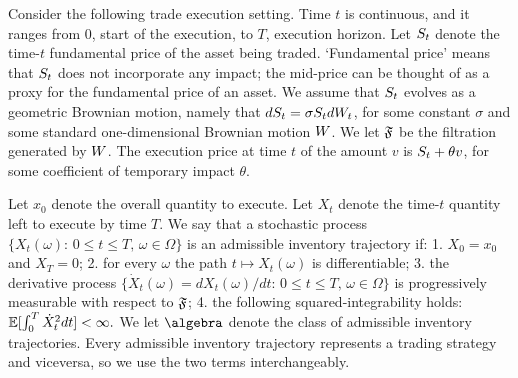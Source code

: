 \documentclass[10pt,a4paper]{article}
\begin{document}
\begin{exercise}
\label{ex.GS11}
Consider the following trade execution setting. 
Time $t$ is continuous, and it ranges from $0$, start of the execution, to $T$, execution horizon. 
Let $S_t$ denote the time-$t$ fundamental price of the asset being traded. 
`Fundamental price' means that $S_t$ does not incorporate any impact;
the mid-price can be thought of as a proxy for the fundamental price of an asset. 
We assume that $S_t$ evolves as a geometric Brownian motion, namely that
$dS_t = \sigma S_t dW_t$, 
for some constant $\sigma$
and some standard one-dimensional Brownian motion $W$. 
We let $\mathfrak{F}$ be the filtration generated by $W$. 
The execution price at time $t$ of the amount $v$ is 
$S_t + \theta v$, 
for some coefficient of temporary impact $\theta$. 

Let $x_0$ denote the overall quantity to execute. 
Let $X_t$ denote the time-$t$ quantity left to execute by time $T$. 
We say that a stochastic process 
  $\lbrace X_t (\omega): \, 0 \leq t \leq T , \, \omega \in \Omega\rbrace$ 
is an admissible inventory trajectory if:
1. $X_0 = x_0$ and $X_T = 0$; 
2. for every $\omega$ the path $t\mapsto X_t (\omega)$ is differentiable; 
3.  
the derivative process 
  $\lbrace \dot{X}_t (\omega) = d X_t (\omega) / dt : \, 0\leq t \leq T, \, \omega \in \Omega\rbrace$
is progressively measurable with respect to $\mathfrak{F}$;
4. the following squared-integrability holds: 
  $\mathbb{{E}}[\int_{0}^{T} \dot{X}_{t}^{2} dt ] < \infty.$
We let $\algebra$ denote the class of admissible inventory trajectories. 
Every admissible inventory trajectory represents a trading strategy and viceversa,
so we use the two terms interchangeably. 


\end{exercise}
\end{document}
